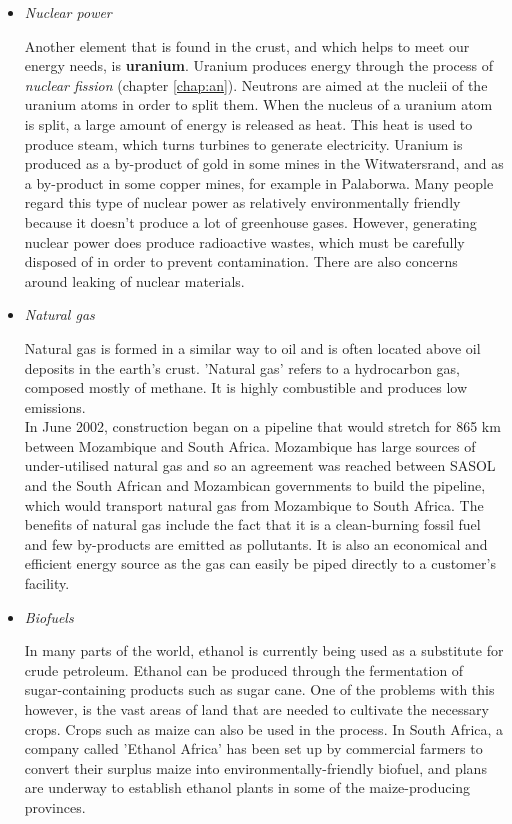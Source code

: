 \begin{itemize}

\item{\textit{Nuclear power}}

Another element that is found in the crust, and which helps to meet our energy needs, is \textbf{uranium}. Uranium produces energy through the process of \textit{nuclear fission} (chapter \ref{chap:an}). Neutrons are aimed at the nucleii of the uranium atoms in order to split them. When the nucleus of a uranium atom is split, a large amount of energy is released as heat. This heat is used to produce steam, which turns turbines to generate electricity. Uranium is produced as a by-product of gold in some mines in the Witwatersrand, and as a by-product in some copper mines, for example in Palaborwa. Many people regard this type of nuclear power as relatively environmentally friendly because it doesn't produce a lot of greenhouse gases. However, generating nuclear power does produce radioactive wastes, which must be carefully disposed of in order to prevent contamination. There are also concerns around leaking of nuclear materials.

\item{\textit{Natural gas}

Natural gas is formed in a similar way to oil and is often located above oil deposits in the earth's crust. 'Natural gas' refers to a hydrocarbon gas, composed mostly of methane. It is highly combustible and produces low emissions.\\

In June 2002, construction began on a pipeline that would stretch for 865 km between Mozambique and South Africa. Mozambique has large sources of under-utilised natural gas and so an agreement was reached between SASOL and the South African and Mozambican governments to build the pipeline, which would transport natural gas from Mozambique to South Africa. The benefits of natural gas include the fact that it is a clean-burning fossil fuel and few by-products are emitted as pollutants. It is also an economical and efficient energy source as the gas can easily be piped directly to a customer's facility.}

\item{\textit{Biofuels}

In many parts of the world, ethanol is currently being used as a substitute for crude petroleum. Ethanol can be produced through the fermentation of sugar-containing products such as sugar cane. One of the problems with this however, is the vast areas of land that are needed to cultivate the necessary crops. Crops such as maize can also be used in the process.
In South Africa, a company called 'Ethanol Africa' has been set up by commercial farmers to convert their surplus maize into environmentally-friendly biofuel, and plans are underway to establish ethanol plants in some of the maize-producing provinces.}


\end{itemize}
